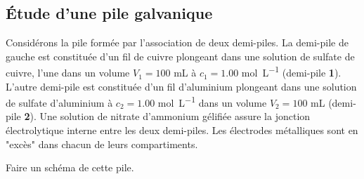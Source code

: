 \subsection{\'{E}tude d'une pile galvanique}

\setcounter{equation}{0}
\setcounter{Q}{0}

Considérons la pile formée par l'association de deux demi-piles. La demi-pile de gauche est constituée d'un fil de cuivre plongeant dans une solution de sulfate de cuivre, l'une dans un volume $V_1 = 100$ \si{\milli\liter} à $c_1 = 1.00$ \si{\mole\per\liter} (demi-pile \textbf{1}). L'autre demi-pile est constituée d'un fil d'aluminium plongeant dans une solution de sulfate d'aluminium à $c_2 = 1.00$ \si{\mole\per\liter} dans un volume $V_2 = 100$ \si{\milli\liter} (demi-pile \textbf{2}). Une solution de
nitrate d'ammonium gélifiée assure la jonction électrolytique interne entre les deux demi-piles. Les électrodes métalliques sont en "excès" dans chacun de leurs compartiments.

\Q Faire un schéma de cette pile.

